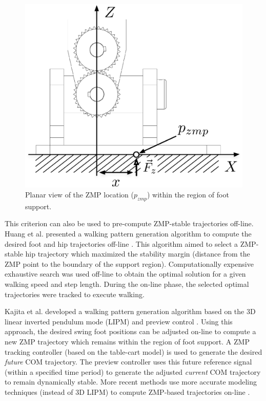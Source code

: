 \begin{figure}[!h]
	\begin{center}
    \includegraphics[scale=0.6]{fig/background/zmpfoot.eps}
	\end{center}
  \caption{Planar view of the ZMP location ($p_{zmp}$) within the region of foot support.}
  \label{fig:zmp}
\end{figure}

This criterion can also be used to pre-compute ZMP-stable trajectories off-line. Huang et al. presented a walking pattern generation algorithm to compute the desired foot and hip trajectories off-line \cite{HuangEtAlTRA2001}. This algorithm aimed to select a ZMP-stable hip trajectory which maximized the stability margin (distance from the ZMP point to the boundary of the support region). Computationally expensive exhaustive search was used off-line to obtain the optimal solution for a given walking speed and step length. During the on-line phase, the selected optimal trajectories were tracked to execute walking.

Kajita et al. developed a walking pattern generation algorithm based on the 3D linear inverted pendulum mode (LIPM) \cite{Kajita:2001fk} and preview control \cite{KajitaEtAlICRA2003}. Using this approach, the desired swing foot positions can be adjusted on-line to compute a new ZMP trajectory which remains within the region of foot support. A ZMP tracking controller (based on the table-cart model) is used to generate the desired \emph{future} COM trajectory. The preview controller uses this future reference signal (within a specified time period) to generate the adjusted \emph{current} COM trajectory to remain dynamically stable. More recent methods use more accurate modeling techniques (instead of 3D LIPM) to compute ZMP-based trajectories on-line \cite{TakenakaEtAlIROS2009}. 

